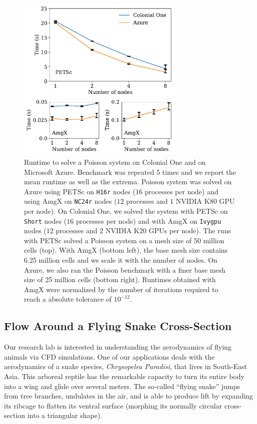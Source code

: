\documentclass[10pt,journal,compsoc]{IEEEtran}
\begin{document}
\begin{figure}[!h]
    \centering
    \includegraphics[width=8cm]{figures/poisson_time_vs_nodes.pdf}
    \caption{Runtime to solve a Poisson system on Colonial One and on Microsoft Azure. Benchmark was repeated 5 times and we report the mean runtime as well as the extrema. Poisson system was solved on Azure using PETSc on \texttt{H16r} nodes ($16$ processes per node) and using AmgX on \texttt{NC24r} nodes ($12$ processes and $1$ NVIDIA K80 GPU per node). On Colonial One, we solved the system with PETSc on \texttt{Short} nodes ($16$ processes per node) and with AmgX on \texttt{Ivygpu} nodes ($12$ processes and $2$ NVIDIA K20 GPUs per node). The runs with PETSc solved a Poisson system on a mesh size of 50 million cells (top). With AmgX (bottom left), the base mesh size contains 6.25 million cells and we scale it with the number of nodes. On Azure, we also ran the Poisson benchmark with a finer base mesh size of 25 million cells (bottom right). Runtimes obtained with AmgX were normalized by the number of iterations required to reach a absolute tolerance of $10^{-12}$.}
    \label{fig:poisson_benchmarks}
\end{figure}

\subsection{Flow Around a Flying Snake Cross-Section}\label{subsec:snake}

Our research lab is interested in understanding the aerodynamics of flying animals via CFD simulations.
One of our applications deals with the aerodynamics of a snake species, \textit{Chrysopelea Paradisi}, that lives in South-East Asia.
This arboreal reptile has the remarkable capacity to turn its entire body into a wing and glide over several meters\cite{socha_2011}.
The so-called ``flying snake'' jumps from tree branches, undulates in the air, and is able to produce lift by expanding its ribcage to flatten its ventral surface (morphing its normally circular cross-section into a triangular shape).
\end{document}

